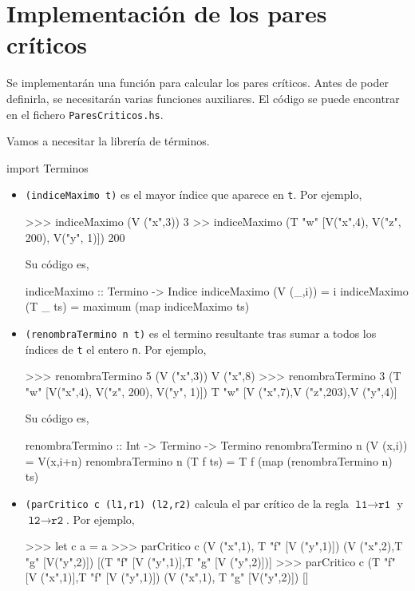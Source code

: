 \section{Implementación de los pares críticos}

Se implementarán una función para calcular los pares críticos. Antes
de poder definirla, se necesitarán varias funciones auxiliares. El
código se puede encontrar en el fichero \texttt{ParesCriticos.hs}.

Vamos a necesitar la librería de términos.
\begin{codigo}
import Terminos
\end{codigo}

\begin{itemize}
\item \texttt{(indiceMaximo t)} es el mayor índice que aparece en
  \texttt{t}. Por ejemplo,
\begin{sesion}
>>> indiceMaximo (V ("x",3))
3
>> indiceMaximo (T "w" [V("x",4), V("z", 200), V("y", 1)])
200
\end{sesion}

Su código es,

\begin{codigo}
indiceMaximo :: Termino -> Indice
indiceMaximo (V (_,i)) = i
indiceMaximo (T _ ts) = maximum (map indiceMaximo ts)
\end{codigo}

\item \texttt{(renombraTermino n t)}
  es el termino resultante tras sumar a todos los índices de
  \texttt{t} el entero \texttt{n}. Por ejemplo,
\begin{sesion}
>>> renombraTermino 5 (V ("x",3)) 
V ("x",8)
>>> renombraTermino 3 (T "w" [V("x",4), V("z", 200), V("y", 1)])
T "w" [V ("x",7),V ("z",203),V ("y",4)]
\end{sesion}

Su código es,

\begin{codigo}
renombraTermino :: Int -> Termino -> Termino
renombraTermino n (V (x,i)) = V(x,i+n)
renombraTermino n (T f ts) = T f (map (renombraTermino n) ts)
\end{codigo}

\item \texttt{(parCritico c (l1,r1) (l2,r2)}  calcula el par crítico de la
  regla $\texttt{l1} \rightarrow \texttt{r1}$ y
  $\texttt{l2} \rightarrow \texttt{r2}$. Por ejemplo,
\begin{sesion}
>>> let c a = a
>>> parCritico c (V ("x",1), T "f" [V ("y",1)])
                 (V ("x",2),T "g" [V("y",2)])
[(T "f" [V ("y",1)],T "g" [V ("y",2)])]
>>> parCritico c (T "f" [V ("x",1)],T "f" [V ("y",1)])
               (V ("x",1), T "g" [V("y",2)])
[]
\end{sesion}


\end{itemize}
